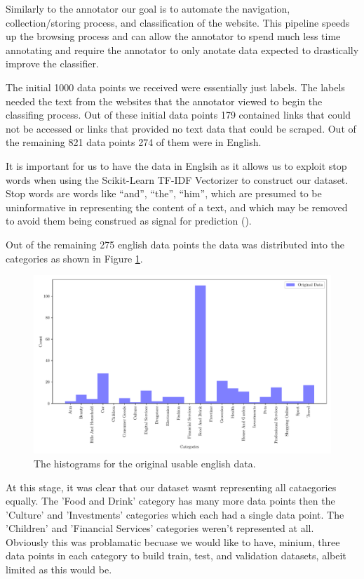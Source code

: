 Similarly to the annotator our goal is to automate the navigation, collection/storing process, and classification of the website. This pipeline speeds up the browsing process and can allow the annotator to spend much less time annotating and require the annotator to only anotate data expected to drastically improve the classifier.

The initial 1000 data points we received were essentially just labels. The labels needed the text from the websites that the annotator viewed to begin the classifing process. Out of these initial data points 179 contained links that could not be accessed or links that provided no text data that could be scraped. Out of the remaining 821 data points 274 of them were in English. 

It is important for us to have the data in Englsih as it allows us to exploit stop words when using the Scikit-Learn TF-IDF Vectorizer to construct our dataset. Stop words are words like “and”, “the”, “him”, which are presumed to be uninformative in representing the content of a text, and which may be removed to avoid them being construed as signal for prediction (\cite{sklearn62feature}).

Out of the remaining 275 english data points the data was distributed into the categories as shown in Figure \ref{fig:og_en_hist}.

\begin{figure}[!ht]
  \centering
  \includegraphics[width=\textwidth]{../img/plot_og_en_hist.pdf}
  \caption{The histograms for the original usable english data.}
  \label{fig:og_en_hist}
\end{figure}

At this stage, it was clear that our dataset wasnt representing all cataegories equally. The 'Food and Drink' category has many more data points then the 'Culture' and 'Investments' categories which each had a single data point. The 'Children' and 'Financial Services' categories weren't represented at all. Obviously this was problamatic becuase we would like to have, minium, three data points in each category to build train, test, and validation datasets, albeit limited as this would be.

